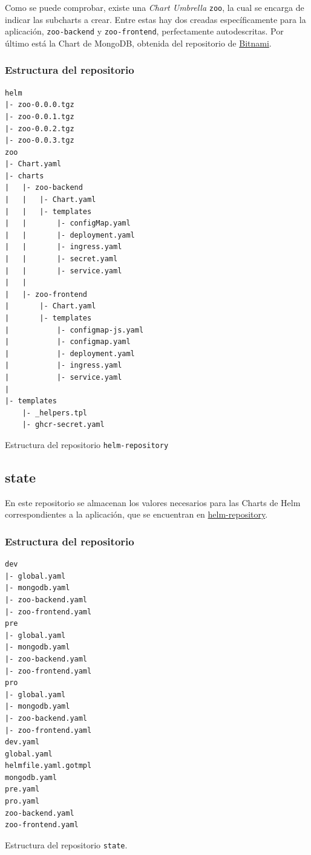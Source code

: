 Como se puede comprobar, existe una \textit{Chart Umbrella} \texttt{zoo}, la cual se encarga de indicar las subcharts a crear. Entre estas hay dos creadas específicamente para la aplicación, \texttt{zoo-backend} y \texttt{zoo-frontend}, perfectamente autodescritas. Por último está la Chart de MongoDB, obtenida del repositorio de \href{https://bitnami.com/stacks?stack=helm}{Bitnami}.

\subsubsection*{Estructura del repositorio}

\begin{longlisting}
  \begin{verbatim}
helm
|- zoo-0.0.0.tgz
|- zoo-0.0.1.tgz
|- zoo-0.0.2.tgz
|- zoo-0.0.3.tgz
zoo
|- Chart.yaml
|- charts
|   |- zoo-backend
|   |   |- Chart.yaml
|   |   |- templates
|   |       |- configMap.yaml
|   |       |- deployment.yaml
|   |       |- ingress.yaml
|   |       |- secret.yaml
|   |       |- service.yaml
|   |
|   |- zoo-frontend
|       |- Chart.yaml
|       |- templates
|           |- configmap-js.yaml
|           |- configmap.yaml
|           |- deployment.yaml
|           |- ingress.yaml
|           |- service.yaml
|   
|- templates
    |- _helpers.tpl
    |- ghcr-secret.yaml
  \end{verbatim}
  \caption{Estructura del repositorio \texttt{helm-repository}}
\end{longlisting}

\subsection{state}

En este repositorio se almacenan los valores necesarios para las Charts de Helm correspondientes a la aplicación, que se encuentran en \href{https://github.com/vieites-tfg/helm-repository}{helm-repository}.

\subsubsection*{Estructura del repositorio}

\begin{listing}[!ht]
  \begin{verbatim}
dev
|- global.yaml
|- mongodb.yaml
|- zoo-backend.yaml
|- zoo-frontend.yaml
pre
|- global.yaml
|- mongodb.yaml
|- zoo-backend.yaml
|- zoo-frontend.yaml
pro
|- global.yaml
|- mongodb.yaml
|- zoo-backend.yaml
|- zoo-frontend.yaml
dev.yaml
global.yaml
helmfile.yaml.gotmpl
mongodb.yaml
pre.yaml
pro.yaml
zoo-backend.yaml
zoo-frontend.yaml
  \end{verbatim}
  \caption{Estructura del repositorio \texttt{state}.}
\end{listing}


